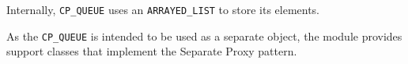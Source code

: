 \documentclass[a4paper,10pt]{article}
\begin{document}
Internally, \lstinline!CP_QUEUE! uses an \lstinline!ARRAYED_LIST! to store its elements.

As the \lstinline!CP_QUEUE! is intended to be used as a separate object, the module provides support classes that implement the Separate Proxy pattern.

% 
% 
% 
\end{document}
